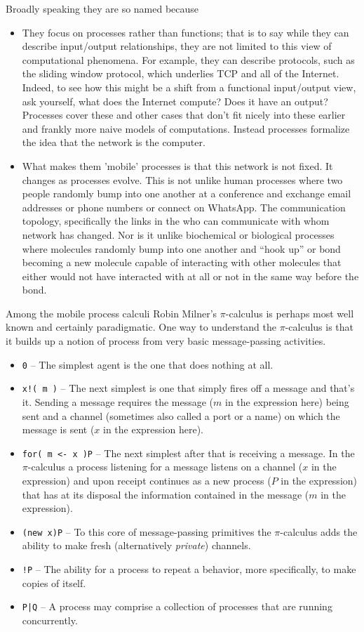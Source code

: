 \documentclass{article}
\newcommand{\code}[1]{\texttt{#1}}
\begin{document}
\medskip

Broadly speaking they are so named because
\begin{itemize}
    \item They focus on processes rather than functions; that is to say while they can describe input/output relationships, they are not limited to this view of computational phenomena. For example, they can describe protocols, such as the sliding window protocol, which underlies TCP and all of the Internet. Indeed, to see how this might be a shift from a functional input/output view, ask yourself, what does the Internet compute? Does it have an output? Processes cover these and other cases that don't fit nicely into these earlier and frankly more naive models of computations. Instead processes formalize the idea that the network is the computer.
    \item What makes them 'mobile' processes is that this network is not fixed. It changes as processes evolve. This is not unlike human processes where two people randomly bump into one another at a conference and exchange email addresses or phone numbers or connect on WhatsApp. The communication topology, specifically the links in the who can communicate with whom network has changed. Nor is it unlike biochemical or biological processes where molecules randomly bump into one another and ``hook up'' or bond becoming a new molecule capable of interacting with other molecules that either would not have interacted with at all or not in the same way before the bond.
\end{itemize}

Among the mobile process calculi Robin Milner's $\pi$-calculus is perhaps most well known and certainly paradigmatic. One way to understand the $\pi$-calculus is that it builds up a notion of process from very basic message-passing activities.
\begin{itemize}
    \item \code{0} – The simplest agent is the one that does nothing at all.
    \item \code{x!( m )} – The next simplest is one that simply fires off a message and that's it. Sending a message requires the message ($m$ in the expression here) being sent and a channel (sometimes also called a port or a name) on which the message is sent ($x$ in the expression here).
    \item \code{for( m <- x )P} – The next simplest after that is receiving a message. In the $\pi$-calculus a process listening for a message listens on a channel ($x$ in the expression) and upon receipt continues as a new process ($P$ in the expression) that has at its disposal the information contained in the message ($m$ in the expression).
    \item \code{(new x)P} – To this core of message-passing primitives the $\pi$-calculus adds the ability to make fresh (alternatively \emph{private}) channels.
    \item \code{!P} – The ability for a process to repeat a behavior, more specifically, to make copies of itself.
    \item \code{P|Q} – A process may comprise a collection of processes that are running concurrently.
\end{itemize}
\end{document}
